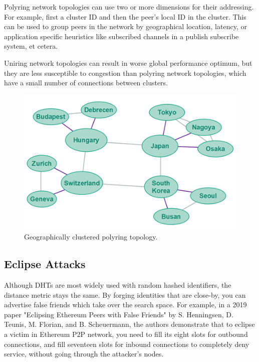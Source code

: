 Polyring network topologies can use two or more dimensions for their addressing. For example, first a cluster ID and then the peer's local ID in the cluster. This can be used to group peers in the network by geographical location, latency, or application specific heuristics like subscribed channels in a publish subscribe system, et cetera.

Uniring network topologies can result in worse global performance optimum, but they are less susceptible to congestion than polyring network topologies, which have a small number of connections between clusters.~\cite{Jenkov_undated-kl}

\begin{figure}
	\includegraphics[width=\textwidth]{pictures/geographical-polyring.png}
	\caption{Geographically clustered polyring topology.\cite{Jenkov_undated-kl}}
	\label{Geographical Polyring}
\end{figure}


\subsection{Eclipse Attacks}
Although DHTs are most widely used with random hashed identifiers, the distance metric stays the same. By forging identities that are close-by, you can advertise false friends which take over the search space. For example, in a 2019 paper "Eclipsing Ethereum Peers with False Friends" by S. Henningsen, D. Teunis, M. Florian, and B. Scheuermann, the authors demonstrate that to eclipse a victim in Ethereum P2P network, you need to fill its eight slots for outbound connections, and fill seventeen slots for inbound connections to completely deny service, without going through the attacker's nodes.~\cite{Henningsen2019-mf}

